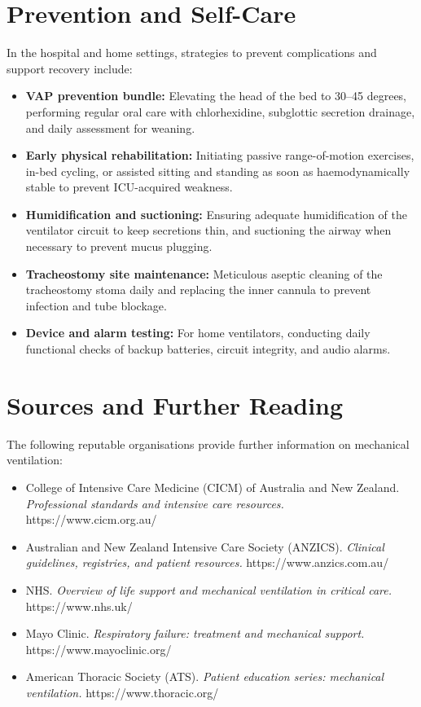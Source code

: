 \section*{Prevention and Self-Care}
In the hospital and home settings, strategies to prevent complications and support recovery include:
\begin{itemize}
    \item \textbf{VAP prevention bundle:} Elevating the head of the bed to 30--45 degrees, performing regular oral care with chlorhexidine, subglottic secretion drainage, and daily assessment for weaning.
    \item \textbf{Early physical rehabilitation:} Initiating passive range-of-motion exercises, in-bed cycling, or assisted sitting and standing as soon as haemodynamically stable to prevent ICU-acquired weakness.
    \item \textbf{Humidification and suctioning:} Ensuring adequate humidification of the ventilator circuit to keep secretions thin, and suctioning the airway when necessary to prevent mucus plugging.
    \item \textbf{Tracheostomy site maintenance:} Meticulous aseptic cleaning of the tracheostomy stoma daily and replacing the inner cannula to prevent infection and tube blockage.
    \item \textbf{Device and alarm testing:} For home ventilators, conducting daily functional checks of backup batteries, circuit integrity, and audio alarms.
\end{itemize}

\section*{Sources and Further Reading}
The following reputable organisations provide further information on mechanical ventilation:
\begin{itemize}
    \item College of Intensive Care Medicine (CICM) of Australia and New Zealand. \textit{Professional standards and intensive care resources.} https://www.cicm.org.au/
    \item Australian and New Zealand Intensive Care Society (ANZICS). \textit{Clinical guidelines, registries, and patient resources.} https://www.anzics.com.au/
    \item NHS. \textit{Overview of life support and mechanical ventilation in critical care.} https://www.nhs.uk/
    \item Mayo Clinic. \textit{Respiratory failure: treatment and mechanical support.} https://www.mayoclinic.org/
    \item American Thoracic Society (ATS). \textit{Patient education series: mechanical ventilation.} https://www.thoracic.org/
\end{itemize}
